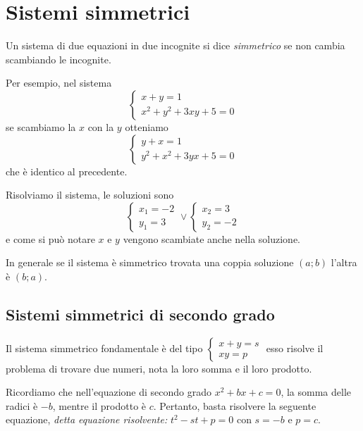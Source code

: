 
\section{Sistemi simmetrici}
Un sistema di due equazioni in due incognite si dice \emph{simmetrico} se non 
cambia scambiando le incognite.

Per esempio, nel sistema 
\[\left\{\begin{array}{l}{x+y=1}\\{x^2+y^2+3{xy}+5=0}\end{array}\right.\] se 
scambiamo la \(x\) con la \(y\) otteniamo 
\[\left\{\begin{array}{l}{y+x=1}\\{y^2+x^2+3{yx}+5=0}\end{array}\right.\] che è 
identico al precedente.

Risolviamo il sistema, le soluzioni sono 
\[\left\{\begin{array}{l}{x_1=-2}\\{y_1=3}\end{array}\right.\vee 
\left\{\begin{array}{l}{x_2=3}\\{y_2=-2}\end{array}\right.\] 
e come si può notare \(x\) e \(y\) vengono scambiate anche nella soluzione.

In generale se il sistema è simmetrico trovata una coppia soluzione \((a;b)\) 
l'altra è \((b;a)\).

\subsection{Sistemi simmetrici di secondo grado}
Il sistema simmetrico fondamentale è del tipo 
\(\left\{\begin{array}{l}{x+y=s}\\{xy=p}\end{array}\right.\) esso risolve il 
problema di trovare due numeri, nota la loro somma e il loro prodotto.

Ricordiamo che nell'equazione di secondo grado \(x^2+bx+c=0\), la somma delle 
radici è \(-b\), mentre il prodotto è \(c\). Pertanto, basta risolvere la 
seguente equazione, \emph{detta equazione risolvente: } \(t^2-st+p=0\) con 
\(s=-b\) e \(p=c\).

